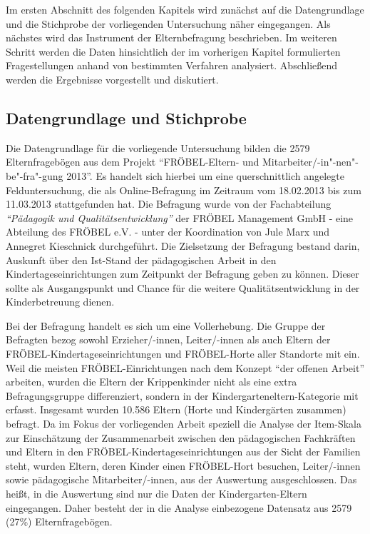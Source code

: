 \documentclass[12pt,a4paper]{article}
\begin{document}
	Im ersten Abschnitt des folgenden Kapitels wird zunächst auf die Datengrundlage und die Stichprobe der vorliegenden Untersuchung näher eingegangen. Als nächstes wird das Instrument der Elternbefragung beschrieben. Im weiteren Schritt werden die Daten hinsichtlich der im vorherigen Kapitel formulierten Fragestellungen anhand von bestimmten Verfahren analysiert. Abschließend werden die Ergebnisse vorgestellt und diskutiert.
 
\subsection{Datengrundlage und Stichprobe}
Die Datengrundlage für die vorliegende Untersuchung bilden die 2579 Elternfragebögen aus dem Projekt "`FRÖBEL-Eltern- und Mitarbeiter/-in"-nen"-be"-fra"-gung 2013"'. Es handelt sich hierbei um eine querschnittlich angelegte Felduntersuchung, die als Online-Befragung im Zeitraum vom 18.02.2013 bis zum 11.03.2013 stattgefunden hat. Die Befragung wurde von der Fachabteilung \textit{"`Pädagogik und Qualitätsentwicklung"'} der FRÖBEL Management GmbH - eine Abteilung des FRÖBEL e.V. - unter der Koordination von Jule Marx und Annegret Kieschnick durchgeführt. Die Zielsetzung der Befragung bestand darin, Auskunft über den Ist-Stand der pädagogischen Arbeit in den Kindertageseinrichtungen zum Zeitpunkt der Befragung geben zu können. Dieser sollte als  Ausgangspunkt und Chance für die weitere Qualitätsentwicklung in der Kinderbetreuung dienen.

	Bei der Befragung handelt es sich um eine Vollerhebung. Die Gruppe der Befragten bezog sowohl Erzieher/-innen, Leiter/-innen als auch Eltern der FRÖBEL-Kindertageseinrichtungen und FRÖBEL-Horte aller Standorte mit ein. Weil die meisten FRÖBEL-Einrichtungen nach dem Konzept "`der offenen Arbeit"' arbeiten, wurden die Eltern der Krippenkinder nicht als eine extra Befragungsgruppe differenziert, sondern in der Kindergarteneltern-Kategorie mit erfasst. Insgesamt wurden 10.586 Eltern (Horte und Kindergärten zusammen) befragt. Da im Fokus der vorliegenden Arbeit speziell die Analyse der Item-Skala zur Einschätzung der Zusammenarbeit zwischen den pädagogischen Fachkräften und Eltern in den FRÖBEL-Kindertageseinrichtungen aus der Sicht der Familien steht, wurden Eltern, deren Kinder einen FRÖBEL-Hort besuchen, Leiter/-innen sowie pädagogische Mitarbeiter/-innen, aus der Auswertung ausgeschlossen. Das heißt, in die Auswertung sind nur die Daten der Kindergarten-Eltern eingegangen. Daher besteht der in die Analyse einbezogene Datensatz aus 2579 (27\%) Elternfragebögen.
	
\end{document}

